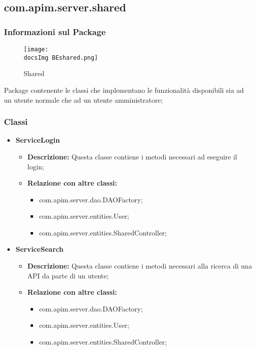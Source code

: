 {{{       \subsection{com.apim.server.shared}{
    \subsubsection{Informazioni sul Package}
        \begin{figure}[ht]
          \centering
          \texttt{[image: \\docsImg BEshared.png]}
          \caption{Shared}
          \label{Shared}
        \end{figure}
        Package  contenente le classi che implementano le funzionalità disponibili sia ad un utente normale che ad un utente amministratore;
        \subsubsection{Classi}
        \begin{itemize} \itemsep1pt
          \item \textbf{ServiceLogin}
          \begin{itemize}
            \item \textbf{Descrizione:} Questa classe contiene i metodi necessari ad eseguire il login;
            \item \textbf{Relazione con altre classi:}
            \begin{itemize}
              \item com.apim.server.dao.DAOFactory;
              \item com.apim.server.entities.User;
              \item com.apim.server.entities.SharedController;
            \end{itemize}
          \end{itemize}
          \item \textbf{ServiceSearch}
          \begin{itemize}
            \item \textbf{Descrizione:} Questa classe contiene i metodi necessari alla ricerca di una API da parte di un utente;
            \item \textbf{Relazione con altre classi:}
            \begin{itemize}
              \item com.apim.server.dao.DAOFactory;
              \item com.apim.server.entities.User;
              \item com.apim.server.entities.SharedController;

\end{itemize}
\end{itemize}
\end{itemize}}}}}
